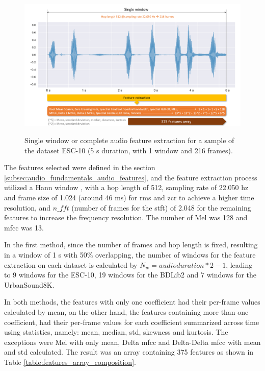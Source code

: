 \begin{figure}[htbp]
    \raggedright
        \caption{Single window or complete audio feature extraction for a sample of the dataset ESC-10 (5 \gls{s} duration, with 1 window and 216 frames).}
        \includegraphics[width=1\textwidth]{resources/images/050-methods/Methods_feature_extraction_2_BDLib2.png}
        \label{fig:methods_feature_extraction_single_window}
\end{figure}

The features selected were defined in the section \ref{subsec:audio_fundamentals_audio_features}, and the feature extraction process utilized a Hann window \cite{Blackmann1958}, with a hop length of 512, sampling rate of 22.050 \gls{hz} and frame size of 1.024 (around 46 ms) for \gls{rms} and \gls{zcr} to achieve a higher time resolution, and $n\_fft$ (number of frames for the \gls{stft}) of 2.048 for the remaining features to increase the frequency resolution. The number of Mel was 128 and \gls{mfcc} was 13.

In the first method, since the number of frames and hop length is fixed, resulting in a window of 1 \gls{s} with 50\% overlapping, the number of windows for the feature extraction on each dataset is calculated by $N_w = audioduration * 2 -1$, leading to 9 windows for the ESC-10, 19 windows for the BDLib2 and 7 windows for the UrbanSound8K.

In both methods, the features with only one coefficient had their per-frame values calculated by mean, on the other hand, the features containing more than one coefficient, had their per-frame values for each coefficient summarized across time using statistics, namely: mean, median, \gls{std}, skewness and kurtosis. The exceptions were Mel with only mean, Delta \gls{mfcc} and Delta-Delta \gls{mfcc} with mean and \gls{std} calculated.  The result was an array containing 375 features as shown in Table \ref{table:features_array_composition}.

